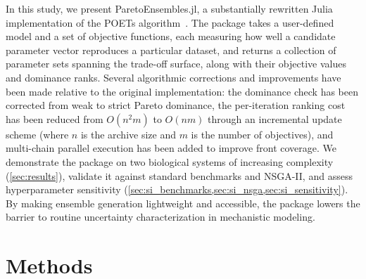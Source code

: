 \documentclass[preprint,review,12pt]{elsarticle}
\begin{document}
In this study, we present ParetoEnsembles.jl, a substantially rewritten Julia implementation of the POETs algorithm~\cite{Song2010,Bassen2016}. The package takes a user-defined model and a set of objective functions, each measuring how well a candidate parameter vector reproduces a particular dataset, and returns a collection of parameter sets spanning the trade-off surface, along with their objective values and dominance ranks. Several algorithmic corrections and improvements have been made relative to the original implementation: the dominance check has been corrected from weak to strict Pareto dominance, the per-iteration ranking cost has been reduced from $O(n^{2}m)$ to $O(nm)$ through an incremental update scheme (where $n$ is the archive size and $m$ is the number of objectives), and multi-chain parallel execution has been added to improve front coverage. We demonstrate the package on two biological systems of increasing complexity (\cref{sec:results}), validate it against standard benchmarks and NSGA-II, and assess hyperparameter sensitivity (\cref{sec:si_benchmarks,sec:si_nsga,sec:si_sensitivity}). By making ensemble generation lightweight and accessible, the package lowers the barrier to routine uncertainty characterization in mechanistic modeling.

\section{Methods}\label{sec:methods}
\end{document}
